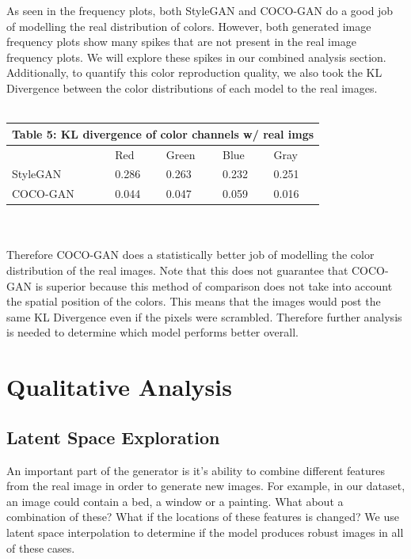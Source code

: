 \documentclass[10pt]{article}
\begin{document}
\begin{multicols*}{2}
        As seen in the frequency plots, both StyleGAN and COCO-GAN do a good job of modelling the real distribution of colors.
        However, both generated image frequency plots show many spikes that are not present in the real image frequency plots.
        We will explore these spikes in our combined analysis section. Additionally, to quantify this color reproduction quality, we also took the KL Divergence between the color distributions of each model to the real images.\\\\
        \begin{tabular}{ |p{2cm}|p{1cm}|p{1cm}|p{1cm}|p{1cm}|  }
             \hline
             \multicolumn{5}{|c|}{Table 5: \textbf{KL divergence of color channels w/ real imgs}} \\
             \hline
            & Red & Green & Blue & Gray  \\
            \hline
            StyleGAN & 0.286    & 0.263      & 0.232     &  0.251 \\
            \hline
            COCO-GAN  & 0.044    & 0.047      & 0.059     &  0.016\\
            \hline
        \end{tabular}
        \\\\
        Therefore COCO-GAN does a statistically better job of modelling the color distribution of the real images. Note that this does not guarantee that COCO-GAN is superior because this method of comparison does not take into account the spatial position of the colors. This means that the images would post the same KL Divergence even if the pixels were scrambled. Therefore further analysis is needed to determine which model performs better overall.


        \section{Qualitative Analysis}
        \label{sec:qualitative}
        \subsection{Latent Space Exploration}
        \label{subsec:latentSpaceExploration}
        An important part of the generator is it's ability to combine different features from the real image in order to generate new images.
        For example, in our dataset, an image could contain a bed, a window or a painting. What about a combination of these?
        What if the locations of these features is changed? We use latent space interpolation to determine if the model produces robust images in all of these cases.


\end{multicols*}
\end{document}
